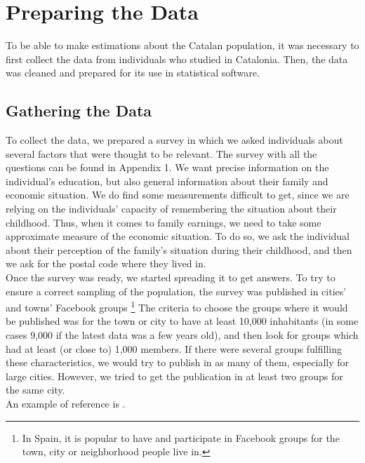 \documentclass[12pt]{article}
\begin{document}
\section{Preparing the Data}

To be able to make estimations about the Catalan population, it was necessary to first collect the data from individuals who studied in Catalonia. Then, the data was cleaned and prepared for its use in statistical software.

\subsection{Gathering the Data}

To collect the data, we prepared a survey in which we asked individuals about several factors that were thought to be relevant. The survey with all the questions can be found in Appendix 1. We want precise information on the individual's education, but also general information about their family and economic situation. We do find some measurements difficult to get, since we are relying on the individuals' capacity of remembering the situation about their childhood. Thus, when it comes to family earnings, we need to take some approximate measure of the economic situation. To do so, we ask the individual about their perception of the family's situation during their childhood, and then we ask for the postal code where they lived in. \\

Once the survey was ready, we started spreading it to get answers. To try to ensure a correct sampling of the population, the survey was published in cities' and towns' Facebook groups \footnote{In Spain, it is popular to have and participate in Facebook groups for the town, city or neighborhood people live in.} The criteria to choose the groups where it would be published was for the town or city to have at least 10,000 inhabitants (in some cases 9,000 if the latest data was a few years old), and then look for groups which had at least (or close to) 1,000 members. If there were several groups fulfilling these characteristics, we would try to publish in as many of them, especially for large cities. However, we tried to get the publication in at least two groups for the same city.\\




An example of reference is \cite{abc}.
\end{document}
